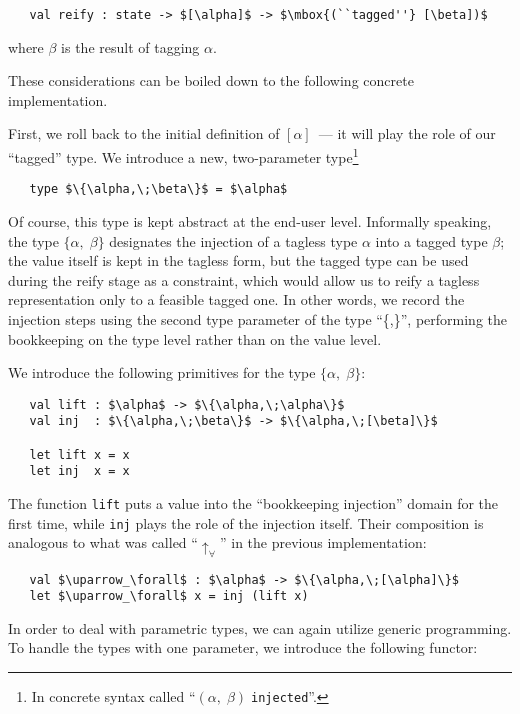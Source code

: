 \begin{lstlisting}
   val reify : state -> $[\alpha]$ -> $\mbox{(``tagged''} [\beta])$
\end{lstlisting}

\noindent where $\beta$ is the result of tagging $\alpha$.

These considerations can be boiled down to the following concrete implementation.

First, we roll back to the initial definition of $[\alpha]$~--- it will play the role of our ``tagged'' type.
We introduce a new, two-parameter type\footnote{In concrete syntax called ``$(\alpha,\;\beta)\;$\lstinline{injected}''.}

\begin{lstlisting}
   type $\{\alpha,\;\beta\}$ = $\alpha$
\end{lstlisting}

Of course, this type is kept abstract at the end-user level. Informally speaking, the type $\{\alpha,\;\beta\}$ designates the
injection of a tagless type $\alpha$ into a tagged type $\beta$; the value itself is kept in the tagless form, but
the tagged type can be used during the reify stage as a constraint, which would allow us to reify a tagless
representation only to a feasible tagged one. In other words, we record the injection steps using the second
type parameter of the type ``\{,\}'', performing the bookkeeping on the type level rather than on the value level.

We introduce the following primitives for the type $\{\alpha,\;\beta\}$:

\begin{lstlisting}
   val lift : $\alpha$ -> $\{\alpha,\;\alpha\}$
   val inj  : $\{\alpha,\;\beta\}$ -> $\{\alpha,\;[\beta]\}$

   let lift x = x
   let inj  x = x
\end{lstlisting}

The function \lstinline{lift} puts a value into the ``bookkeeping injection'' domain for the first time, while
\lstinline{inj} plays the role of the injection itself. Their composition is analogous to what was
called ``$\uparrow_\forall$'' in the previous implementation:

\begin{lstlisting}
   val $\uparrow_\forall$ : $\alpha$ -> $\{\alpha,\;[\alpha]\}$
   let $\uparrow_\forall$ x = inj (lift x)
\end{lstlisting}

In order to deal with parametric types, we can again utilize generic programming. To handle the types with
one parameter, we introduce the following functor:

